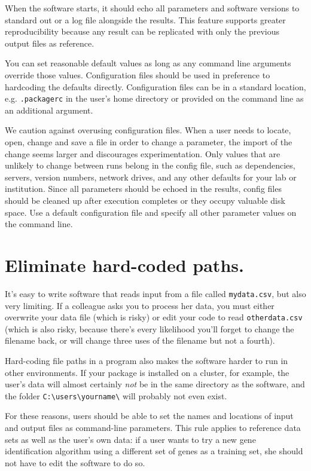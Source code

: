 \documentclass[10pt]{article}
\begin{document}
When the software starts, it should echo all parameters and software
versions to standard out or a log file alongside the results. This
feature supports greater reproducibility because any result can be
replicated with only the previous output files as reference.

You can set reasonable default values
as long as any command line arguments
override those values. Configuration files should be used in preference
to hardcoding the defaults directly. Configuration files can be in a standard
location, e.g. \texttt{.packagerc} in the user's home directory or
provided on the command line as an additional argument.

We caution against overusing configuration files. When a user needs to
locate, open, change and save a file in order to change a parameter, the
import of the change seems larger and discourages experimentation. 
Only values that are unlikely to
change between runs belong in the config file, such as dependencies,
servers, version numbers, network drives, and any other defaults for
your lab or institution. 
Since
all parameters should be echoed in the results, config files should be
cleaned up after execution completes or they occupy valuable disk space.
Use a default configuration file and specify all other parameter values on the
command line.

\section{Eliminate hard-coded paths.}

It's easy to write software that reads input from a file called
\texttt{mydata.csv}, but also very limiting. If a colleague asks you to
process her data, you must either overwrite your data file (which is
risky) or edit your code to read \texttt{otherdata.csv} (which is also
risky, because there's every likelihood you'll forget to change the
filename back, or will change three uses of the filename but not a
fourth).

Hard-coding file paths in a program also makes the software harder to run
in other environments. If your package is installed on a cluster, for
example, the user's data will almost certainly \emph{not} be in the same
directory as the software, and the folder
\texttt{C:\textbackslash{}users\textbackslash{}yourname\textbackslash{}}
will probably not even exist.

For these reasons, users should be able to set the names and locations
of input and output files as command-line parameters. This rule applies
to reference data sets as well as the user's own data: if a user wants
to try a new gene identification algorithm using a different set of
genes as a training set, she should not have to edit the software to do
so.
\end{document}
